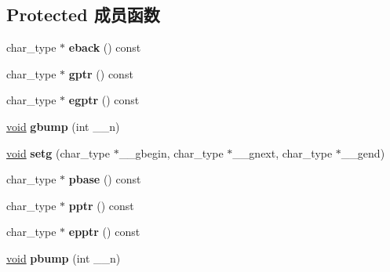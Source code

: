 \subsection*{Protected 成员函数}
\begin{DoxyCompactItemize}
\item 
\mbox{\label{classbasic__streambuf_afad0040f527c0b3585a3122755b03697}} 
char\+\_\+type $\ast$ {\bfseries eback} () const
\item 
\mbox{\label{classbasic__streambuf_aee3e83d262aa58bc560dfdef0dfd49d3}} 
char\+\_\+type $\ast$ {\bfseries gptr} () const
\item 
\mbox{\label{classbasic__streambuf_a8709d18b41cf18aa215d3fd39b028031}} 
char\+\_\+type $\ast$ {\bfseries egptr} () const
\item 
\mbox{\label{classbasic__streambuf_aec0994a3a5ca9d4f4d1af93a63122f70}} 
\hyperlink{interfacevoid}{void} {\bfseries gbump} (int \+\_\+\+\_\+n)
\item 
\mbox{\label{classbasic__streambuf_ad665468c2d92541af3f078fbc191c301}} 
\hyperlink{interfacevoid}{void} {\bfseries setg} (char\+\_\+type $\ast$\+\_\+\+\_\+gbegin, char\+\_\+type $\ast$\+\_\+\+\_\+gnext, char\+\_\+type $\ast$\+\_\+\+\_\+gend)
\item 
\mbox{\label{classbasic__streambuf_ad5847c2403a08d9ef55e7af5326baac8}} 
char\+\_\+type $\ast$ {\bfseries pbase} () const
\item 
\mbox{\label{classbasic__streambuf_aa889281ce5b001d66c57cfbf80104c14}} 
char\+\_\+type $\ast$ {\bfseries pptr} () const
\item 
\mbox{\label{classbasic__streambuf_aba87e521e42689d11af8d03ecd493bdb}} 
char\+\_\+type $\ast$ {\bfseries epptr} () const
\item 
\mbox{\label{classbasic__streambuf_a7cb6f760824314729fc3d1b230c49d6c}} 
\hyperlink{interfacevoid}{void} {\bfseries pbump} (int \+\_\+\+\_\+n)
\item 

\end{DoxyCompactItemize}
